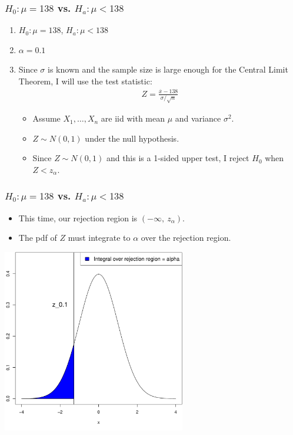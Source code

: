 \documentclass[handout]{beamer}\usepackage[]{graphicx}\usepackage[]{color}
\newenvironment{knitrout}{}{} %
\providecommand{\ov}[1]{\overline{#1}}
\numberwithin{equation}{section}
\begin{document}
\begin{frame}
\frametitle{ $H_0: \mu = 138$ vs. $H_a: \mu < 138$} \small
\begin{enumerate}[1. ]
\item  $H_0: \mu = 138$, $H_a: \mu < 138$
\pause \item $\alpha = 0.1$
\pause \item Since $\sigma$ is known and the sample size is large enough for the Central Limit Theorem, I will use the test statistic:
\begin{align*}
Z = \frac{\ov{x} - 138}{\sigma/\sqrt{n}}
\end{align*}
\begin{itemize}
\pause \item Assume $X_1, \ldots, X_n$ are iid with mean $\mu$ and variance $\sigma^2$.
\pause \item $Z \sim N(0,1)$ under the null hypothesis.
\pause \item Since $Z \sim N(0,1)$ and this is a 1-sided upper test, I reject $H_0$ when $Z < z_{\alpha}$.
\end{itemize}

\end{enumerate}
\end{frame}


\begin{frame}
\frametitle{ $H_0: \mu = 138$ vs. $H_a: \mu < 138$} \small
\begin{itemize}
\item This time, our rejection region is $(-\infty,\  z_{\alpha})$.
\pause \item The pdf of $Z$ must integrate to $\alpha$ over the rejection region.
\end{itemize}
\pause \begin{center}
\begin{knitrout}
\color{fgcolor}
\includegraphics[width=0.6\textwidth,height=0.6\textheight]{figure/unnamed-chunk-3-1} 

\end{knitrout}

\end{center}
\end{frame}
\end{document}
